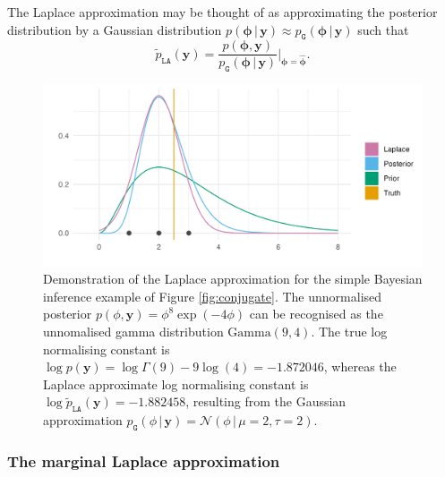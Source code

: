 \documentclass[a4paper, nobind]{templates/ociamthesis}
\begin{document}
The Laplace approximation may be thought of as approximating the posterior distribution by a Gaussian distribution \(p(\boldsymbol{\mathbf{\phi}} \, | \, \mathbf{y}) \approx p_\texttt{G}(\boldsymbol{\mathbf{\phi}} \, | \, \mathbf{y})\) such that
\begin{equation}
\tilde p_{\texttt{LA}}(\mathbf{y}) = \frac{p(\boldsymbol{\mathbf{\phi}}, \mathbf{y})}{p_\texttt{G}(\boldsymbol{\mathbf{\phi}} \, | \, \mathbf{y})} \Big\rvert_{\boldsymbol{\mathbf{\phi}} = \hat{\boldsymbol{\mathbf{\phi}}}}.
\end{equation}



\begin{figure}

{\centering \includegraphics[width=0.95\linewidth]{figures/naomi-aghq/laplace} 

}

\caption{Demonstration of the Laplace approximation for the simple Bayesian inference example of Figure \ref{fig:conjugate}. The unnormalised posterior \(p(\phi, \mathbf{y}) = \phi^8 \exp(-4 \phi)\) can be recognised as the unnomalised gamma distribution \(\text{Gamma}(9, 4)\). The true log normalising constant is \(\log p(\mathbf{y}) = \log\Gamma(9) - 9 \log(4) = -1.872046\), whereas the Laplace approximate log normalising constant is \(\log \tilde p_{\texttt{LA}}(\mathbf{y}) = -1.882458\), resulting from the Gaussian approximation \(p_\texttt{G}(\phi \, | \, \mathbf{y}) = \mathcal{N}(\phi \, | \,\mu = 2, \tau = 2)\).}\label{fig:laplace}
\end{figure}

\hypertarget{the-marginal-laplace-approximation}{%
\subsubsection{The marginal Laplace approximation}\label{the-marginal-laplace-approximation}}
\end{document}
